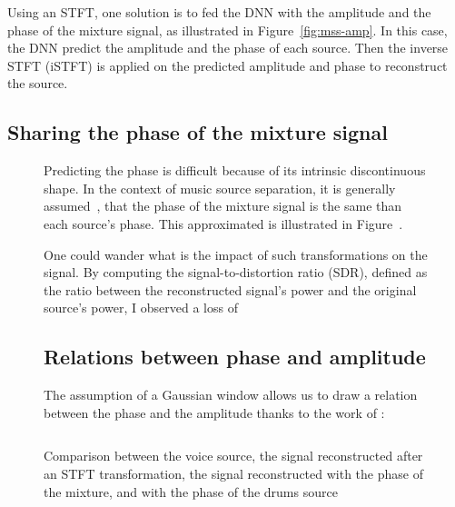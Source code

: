 Using an STFT, one solution is to fed the DNN with the amplitude and the phase of the mixture signal, as illustrated in Figure~\ref{fig:mss-amp}.
In this case, the DNN predict the amplitude and the phase of each source. Then the inverse STFT (iSTFT) is applied on the predicted amplitude and phase to reconstruct the source. 


\subsection{Sharing the phase of the mixture signal}

\begin{figure}
  \centering
  \label{fig:approx-phase.png}
  \caption{Comparison between the voice source, the signal reconstructed after an STFT transformation, the signal reconstructed with the phase of the mixture, and with the phase of the drums source}

Predicting the phase is difficult because of its intrinsic discontinuous shape. 
In the context of music source separation, it is generally assumed~\cite{chandna2017monoaural}, \cite{jansson2017singing} that the phase of the mixture signal is the same than each source's phase.
This approximated is illustrated in Figure~\cite{fig:approx-phase}. 

One could wander what is the impact of such transformations on the signal. By computing the signal-to-distortion ratio (SDR), defined as the ratio between the reconstructed signal's power and the original source's power, I observed a loss of 


\subsection{Relations between phase and amplitude} 

The assumption of a Gaussian window allows us to draw a relation between the phase and the amplitude thanks to the work of \cite{auger2012phase}:

\begin{equation}
    [
    \left\{ 
        \begin{array}{ll}
            \frac{\partial }{\partial t}\phi(\omega, \tau) &= \lambda^{-2}   \frac{\partial}{\partial \omega} \log(A(\omega, \tau)) + \frac{\omega}{2} \\
            \frac{\partial d}{\partial \omega}\phi(\omega, \tau) &= -\lambda^{-2}   \frac{\partial}{\partial t} \log(A(\omega, \tau)) - \frac{t}{2}
        \end{array}
    \right.
    ]
\end{equation}


\end{figure}

